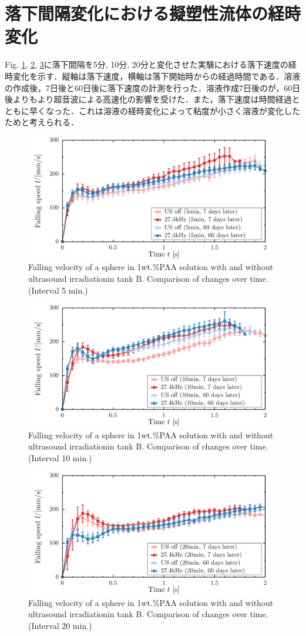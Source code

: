 \section{落下間隔変化における擬塑性流体の経時変化}

Fig. \ref{fig:falling-5-2}, \ref{fig:falling-10-2}, \ref{fig:falling-20-2}に落下間隔を5分, 10分, 20分と変化させた実験における落下速度の経時変化を示す．縦軸は落下速度，横軸は落下開始時からの経過時間である．溶液の作成後，7日後と60日後に落下速度の計測を行った．溶液作成7日後のが，60日後よりもより超音波による高速化の影響を受けた．また，落下速度は時間経過とともに早くなった．これは溶液の経時変化によって粘度が小さく溶液が変化したためと考えられる．

\begin{figure}[H]
    \centering
    \includegraphics[width=11cm,clip]{X-Appendix/5.png}
    \caption{Falling velocity of a sphere in 1wt.\%PAA solution with and without ultrasound irradiationin tank B. Comparison of changes over time. (Interval 5 min.)}
    \label{fig:falling-5-2}
\end{figure}
\begin{figure}[H]
    \centering
    \includegraphics[width=11cm,clip]{X-Appendix/10.png}
    \caption{Falling velocity of a sphere in 1wt.\%PAA solution with and without ultrasound irradiationin tank B. Comparison of changes over time. (Interval 10 min.)}
    \label{fig:falling-10-2}
\end{figure}
\begin{figure}[H]
    \centering
    \includegraphics[width=11cm,clip]{X-Appendix/20.png}
    \caption{Falling velocity of a sphere in 1wt.\%PAA solution with and without ultrasound irradiationin tank B. Comparison of changes over time. (Interval 20 min.)}
    \label{fig:falling-20-2}
\end{figure}
